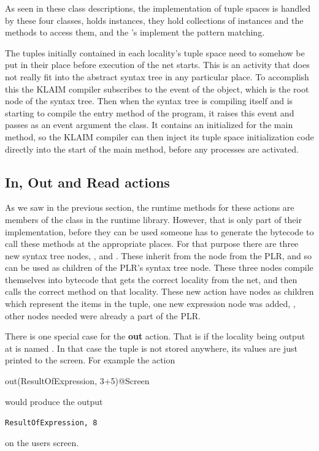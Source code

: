 	As seen in these class descriptions, the implementation of tuple spaces is 
	handled by these four classes,  holds  
	instances, they hold collections of  instances and the methods 
	to access them, and the 's implement the pattern matching.
	
	The tuples initially contained in each locality's tuple space need to 
	somehow be put in their place before execution of the net starts. This is an 
	activity that does not really fit into the abstract syntax tree in any 
	particular place. To accomplish this the KLAIM compiler subscribes to the 
	event  of the  object, which 
	is the root node of the syntax tree. Then when the syntax tree is compiling 
	itself and is starting to compile the entry method of the program, it raises 
	this event and passes as an event argument the  
	class. It contains an initialized  for the main method, 
	so the KLAIM compiler can then inject its tuple space initialization code 
	directly into the start of the main method, before any processes are 
	activated.
	
	\subsection{In, Out and Read actions}
	
	As we saw in the previous section, the runtime methods for these actions are 
	members of the  class in the runtime library. However, that 
	is only part of their implementation, before they can be used someone has to 
	generate the bytecode to call these methods at the appropriate places. For 
	that purpose there are three new syntax tree nodes, , 
	 and . These inherit from the 
	 node from the PLR, and so can be used as children of the 
	PLR's  syntax tree node. These three nodes compile 
	themselves into bytecode that gets the correct locality from the net, and 
	then calls the correct method on that locality. These new action have 
	 nodes as children which represent the items in the 
	tuple, one new expression node was added, , other 
	nodes needed were already a part of the PLR.
	
	There is one special case for the \textbf{out} action. That is if the 
	locality being output at is named . In that case the tuple is 
	not stored anywhere, its values are just printed to the screen. For example 
	the action \begin{center}\textsf{out(ResultOfExpression, 3+5)@Screen}\end{center} would produce the output \begin{center}\texttt{ResultOfExpression, 8} \end{center} on the users screen.
	
